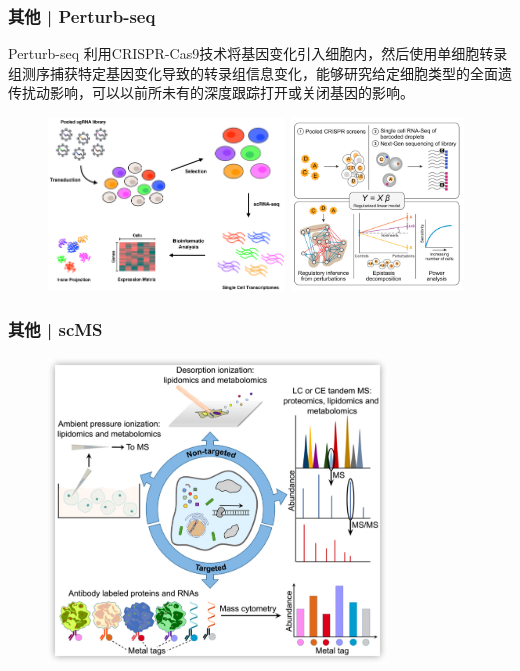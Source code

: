 \documentclass[11pt]{ctexbeamer}
\begin{document}
\begin{frame}
	\frametitle{其他 | Perturb-seq}
	\begin{block}{Perturb-seq}
		利用CRISPR-Cas9技术将基因变化引入细胞内，然后使用单细胞转录组测序捕获特定基因变化导致的转录组信息变化，能够研究给定细胞类型的全面遗传扰动影响，可以以前所未有的深度跟踪打开或关闭基因的影响。
		\end{block}
				\begin{figure}
		\includegraphics[width=0.56\textwidth]{perturb-seq_01.png}
		\includegraphics[width=0.41\textwidth]{perturb-seq_03.png}
	\end{figure}
\end{frame}

\begin{frame}
	\frametitle{其他 | scMS}
			\begin{figure}
		\includegraphics[width=0.8\textwidth]{scMS.png}
	\end{figure}
\end{frame}
\end{document}
